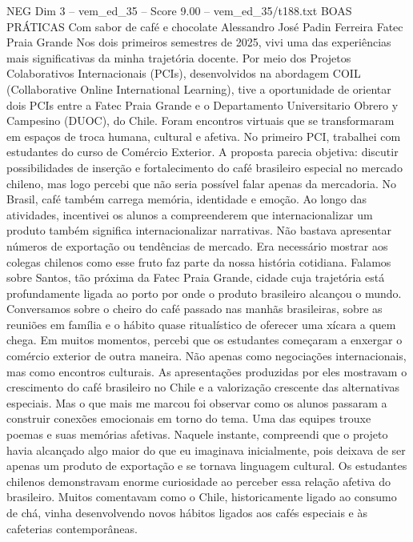 \begin{textsample}{NEG Dim 3 – vem\_ed\_35 – Score 9.00 – vem\_ed\_35/t188.txt}  \label{ex:f3_neg_137}
BOAS PRÁTICAS Com sabor de café e chocolate Alessandro José Padin Ferreira Fatec Praia Grande Nos dois primeiros semestres de 2025, vivi uma das experiências mais significativas da minha trajetória docente.
Por meio dos Projetos Colaborativos Internacionais (PCIs), desenvolvidos na abordagem COIL (Collaborative Online International Learning), tive a oportunidade de orientar dois PCIs entre a Fatec Praia Grande e o Departamento Universitario Obrero y Campesino (DUOC), do Chile.
Foram encontros virtuais que se transformaram em espaços de troca humana, cultural e afetiva.
No primeiro PCI, trabalhei com estudantes do curso de Comércio Exterior.
A proposta parecia objetiva: discutir possibilidades de inserção e fortalecimento do café brasileiro especial no mercado chileno, mas logo percebi que não seria possível falar apenas da mercadoria.
No Brasil, café também carrega memória, identidade e emoção.
Ao longo das atividades, incentivei os alunos a compreenderem que internacionalizar um produto também significa internacionalizar narrativas.
Não bastava apresentar números de exportação ou tendências de mercado.
Era necessário mostrar aos colegas chilenos como esse fruto faz parte da nossa história cotidiana.
Falamos sobre Santos, tão próxima da Fatec Praia Grande, cidade cuja trajetória está profundamente ligada ao porto por onde o produto brasileiro alcançou o mundo.
Conversamos sobre o cheiro do café passado nas manhãs brasileiras, sobre as reuniões em família e o hábito quase ritualístico de oferecer uma xícara a quem chega.
Em muitos momentos, percebi que os estudantes começaram a enxergar o comércio exterior de outra maneira.
Não apenas como negociações internacionais, mas como encontros culturais.
As apresentações produzidas por eles mostravam o crescimento do café brasileiro no Chile e a valorização crescente das alternativas especiais.
Mas o que mais me marcou foi observar como os alunos passaram a construir conexões emocionais em torno do tema.
Uma das equipes trouxe poemas e suas memórias afetivas.
Naquele instante, compreendi que o projeto havia alcançado algo maior do que eu imaginava inicialmente, pois deixava de ser apenas um produto de exportação e se tornava linguagem cultural.
Os estudantes chilenos demonstravam enorme curiosidade ao perceber essa relação afetiva do brasileiro.
Muitos comentavam como o Chile, historicamente ligado ao consumo de chá, vinha desenvolvendo novos hábitos ligados aos cafés especiais e às cafeterias contemporâneas.

\end{textsample}
